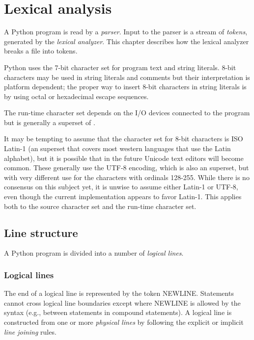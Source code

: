 \chapter{Lexical analysis\label{lexical}}

A Python program is read by a \emph{parser}.  Input to the parser is a
stream of \emph{tokens}, generated by the \emph{lexical analyzer}.  This
chapter describes how the lexical analyzer breaks a file into tokens.

Python uses the 7-bit \ASCII{} character set for program text and string
literals. 8-bit characters may be used in string literals and comments
but their interpretation is platform dependent; the proper way to
insert 8-bit characters in string literals is by using octal or
hexadecimal escape sequences.

The run-time character set depends on the I/O devices connected to the
program but is generally a superset of \ASCII.

 It may be tempting to assume that the
character set for 8-bit characters is ISO Latin-1 (an \ASCII{}
superset that covers most western languages that use the Latin
alphabet), but it is possible that in the future Unicode text editors
will become common.  These generally use the UTF-8 encoding, which is
also an \ASCII{} superset, but with very different use for the
characters with ordinals 128-255.  While there is no consensus on this
subject yet, it is unwise to assume either Latin-1 or UTF-8, even
though the current implementation appears to favor Latin-1.  This
applies both to the source character set and the run-time character
set.


\section{Line structure\label{line-structure}}

A Python program is divided into a number of \emph{logical lines}.


\subsection{Logical lines\label{logical}}

The end of
a logical line is represented by the token NEWLINE.  Statements cannot
cross logical line boundaries except where NEWLINE is allowed by the
syntax (e.g., between statements in compound statements).
A logical line is constructed from one or more \emph{physical lines}
by following the explicit or implicit \emph{line joining} rules.


